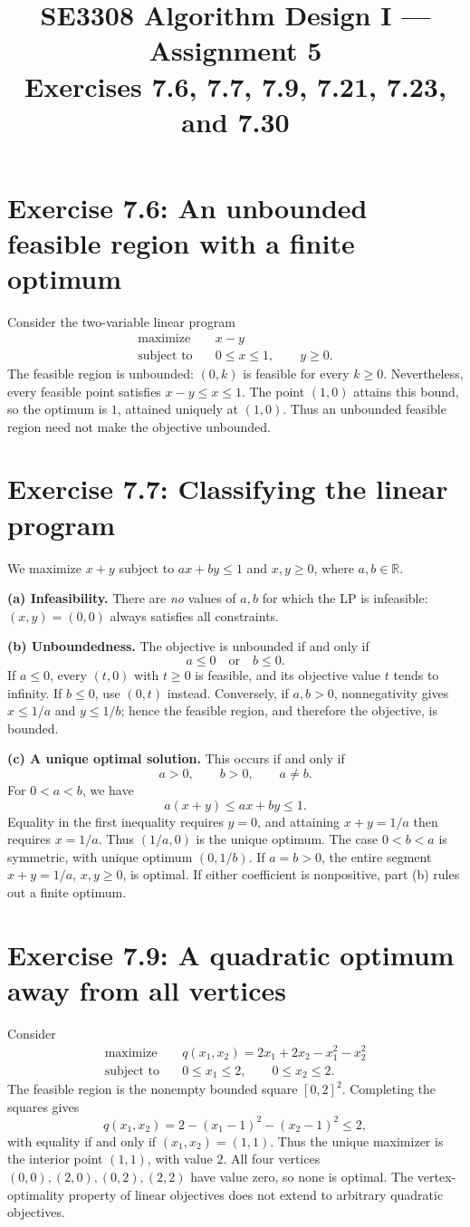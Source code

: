 \documentclass[11pt]{article}
\title{SE3308 Algorithm Design I --- Assignment 5\\[0.3em]
\large Exercises 7.6, 7.7, 7.9, 7.21, 7.23, and 7.30}
\author{\studentname\quad\studentid}
\date{}
\newcommand{\exercise}[2]{\section*{Exercise #1: #2}}
\begin{document}
\maketitle
\vspace{-1.2em}

\exercise{7.6}{An unbounded feasible region with a finite optimum}
Consider the two-variable linear program
\[
 \begin{aligned}
  \text{maximize}\quad &x-y\\
  \text{subject to}\quad &0\le x\le1,\qquad y\ge0.
 \end{aligned}
\]
The feasible region is unbounded: $(0,k)$ is feasible for every $k\ge0$.
Nevertheless, every feasible point satisfies $x-y\le x\le1$.
The point $(1,0)$ attains this bound, so the optimum is
\(\boxed{1}\), attained uniquely at \(\boxed{(1,0)}\).
Thus an unbounded feasible region need not make the objective unbounded.

\exercise{7.7}{Classifying the linear program}
We maximize $x+y$ subject to $ax+by\le1$ and $x,y\ge0$,
where $a,b\in\mathbb R$.

\textbf{(a) Infeasibility.}
There are \emph{no} values of $a,b$ for which the LP is infeasible:
$(x,y)=(0,0)$ always satisfies all constraints.

\textbf{(b) Unboundedness.}
The objective is unbounded if and only if
\[
 \boxed{a\le0\quad\text{or}\quad b\le0.}
\]
If $a\le0$, every $(t,0)$ with $t\ge0$ is feasible, and its objective
value $t$ tends to infinity. If $b\le0$, use $(0,t)$ instead.
Conversely, if $a,b>0$, nonnegativity gives $x\le1/a$ and $y\le1/b$;
hence the feasible region, and therefore the objective, is bounded.

\textbf{(c) A unique optimal solution.}
This occurs if and only if
\[
 \boxed{a>0,\qquad b>0,\qquad a\ne b.}
\]
For $0<a<b$, we have
\[
 a(x+y)\le ax+by\le1.
\]
Equality in the first inequality requires $y=0$, and attaining
$x+y=1/a$ then requires $x=1/a$. Thus $(1/a,0)$ is the unique optimum.
The case $0<b<a$ is symmetric, with unique optimum $(0,1/b)$.
If $a=b>0$, the entire segment $x+y=1/a$, $x,y\ge0$, is optimal.
If either coefficient is nonpositive, part (b) rules out a finite optimum.

\newpage
\exercise{7.9}{A quadratic optimum away from all vertices}
Consider
\[
 \begin{aligned}
  \text{maximize}\quad &q(x_1,x_2)=2x_1+2x_2-x_1^2-x_2^2\\
  \text{subject to}\quad &0\le x_1\le2,\qquad 0\le x_2\le2.
 \end{aligned}
\]
The feasible region is the nonempty bounded square $[0,2]^2$.
Completing the squares gives
\[
 q(x_1,x_2)=2-(x_1-1)^2-(x_2-1)^2\le2,
\]
with equality if and only if $(x_1,x_2)=(1,1)$. Thus the unique
maximizer is the interior point \(\boxed{(1,1)}\), with value
\(\boxed{2}\). All four vertices $(0,0),(2,0),(0,2),(2,2)$ have value
zero, so none is optimal. The vertex-optimality property of linear
objectives does not extend to arbitrary quadratic objectives.
\end{document}
